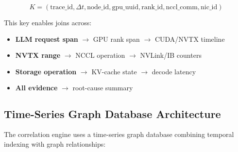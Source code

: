 \documentclass[conference,10pt]{IEEEtran}
\begin{document}
\begin{equation}
K = (\text{trace\_id}, \Delta t, \text{node\_id}, \text{gpu\_uuid}, \text{rank\_id}, \text{nccl\_comm}, \text{nic\_id})
\label{eq:joinkey}
\end{equation}

This key enables joins across:
\begin{itemize}
\item \textbf{LLM request span} $\to$ GPU rank span $\to$ CUDA/NVTX timeline
\item \textbf{NVTX range} $\to$ NCCL operation $\to$ NVLink/IB counters
\item \textbf{Storage operation} $\to$ KV-cache state $\to$ decode latency
\item \textbf{All evidence} $\to$ root-cause summary
\end{itemize}

\subsection{Time-Series Graph Database Architecture}

The correlation engine uses a time-series graph database combining temporal indexing with graph relationships:
\end{document}
